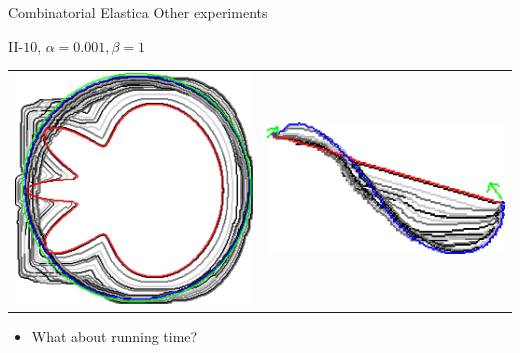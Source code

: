 \begin{frame}
	{Combinatorial Elastica}
	{Other experiments}
\begin{center}
II-$10$, $\alpha=0.001, \beta=1$

\vspace{1em}
	
\begin{tabular}{cc}
\includegraphics[scale=0.25]{figures/combinatorial-elastica/other-experiments/ii/elastica/len_pen_0.001000/jonctions_1/curve_segs_4/best/gs_0.25000/flower.png}&
\includegraphics[scale=0.25]{figures/combinatorial-elastica/other-experiments/ii/elastica/len_pen_0.001000/jonctions_1/curve_segs_4/best/gs_0.25000/curve.png}
\end{tabular}
\end{center}

\vspace{1em}
\pause

\begin{itemize}
\item{What about running time?}
\end{itemize}

\end{frame}

